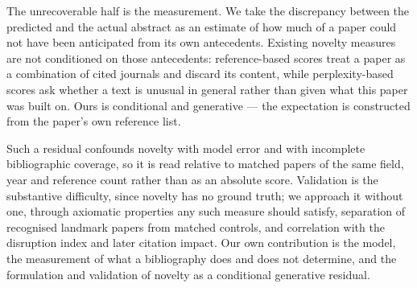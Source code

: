 \documentclass[12pt]{article}
\begin{document}
The unrecoverable half is the measurement. We take the discrepancy
between the predicted and the actual abstract as an estimate of how
much of a paper could not have been anticipated from its own
antecedents. Existing novelty measures are not conditioned on those
antecedents: reference-based scores treat a paper as a combination of
cited journals and discard its content, while perplexity-based scores
ask whether a text is unusual in general rather than given what this
paper was built on. Ours is conditional and generative — the
expectation is constructed from the paper's own reference list.

Such a residual confounds novelty with model error and with
incomplete bibliographic coverage, so it is read relative to matched
papers of the same field, year and reference count rather than as an
absolute score. Validation is the substantive difficulty, since
novelty has no ground truth; we approach it without one, through
axiomatic properties any such measure should satisfy, separation of
recognised landmark papers from matched controls, and correlation
with the disruption index and later citation impact. Our own
contribution is the model, the measurement of what a bibliography
does and does not determine, and the formulation and validation of
novelty as a conditional generative residual.
\end{document}
